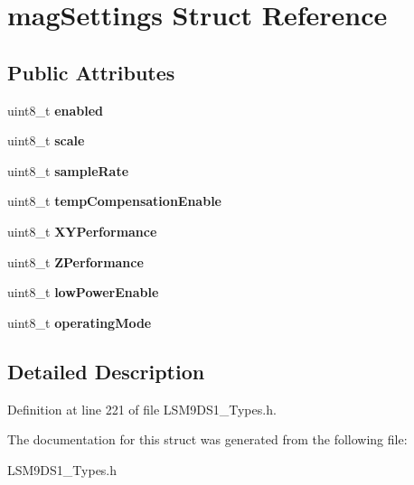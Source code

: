 \hypertarget{structmagSettings}{}\section{mag\+Settings Struct Reference}
\label{structmagSettings}
\subsection*{Public Attributes}
\begin{DoxyCompactItemize}
\item 
\mbox{\label{structmagSettings_a97f8e5c4baf3fc9a662f84fedb188f3c}} 
uint8\+\_\+t {\bfseries enabled}
\item 
\mbox{\label{structmagSettings_a5966915104376cb76d9eb787bab024bc}} 
uint8\+\_\+t {\bfseries scale}
\item 
\mbox{\label{structmagSettings_aca3dbf81e533dce344e618a3df199c1e}} 
uint8\+\_\+t {\bfseries sample\+Rate}
\item 
\mbox{\label{structmagSettings_afcfa1e532fa140e42dc34a4abd7926ae}} 
uint8\+\_\+t {\bfseries temp\+Compensation\+Enable}
\item 
\mbox{\label{structmagSettings_ad36c7bb251858fb289841c91fb615a5f}} 
uint8\+\_\+t {\bfseries X\+Y\+Performance}
\item 
\mbox{\label{structmagSettings_a0ab41f0670a3fd20ce1a43332f6fe949}} 
uint8\+\_\+t {\bfseries Z\+Performance}
\item 
\mbox{\label{structmagSettings_abd59df268c0798fceacea68b956009df}} 
uint8\+\_\+t {\bfseries low\+Power\+Enable}
\item 
\mbox{\label{structmagSettings_ae3f0044de2fbdff6d7b830c36f26c450}} 
uint8\+\_\+t {\bfseries operating\+Mode}
\end{DoxyCompactItemize}


\subsection{Detailed Description}


Definition at line 221 of file L\+S\+M9\+D\+S1\+\_\+\+Types.\+h.



The documentation for this struct was generated from the following file\+:\begin{DoxyCompactItemize}
\item 
L\+S\+M9\+D\+S1\+\_\+\+Types.\+h\end{DoxyCompactItemize}
